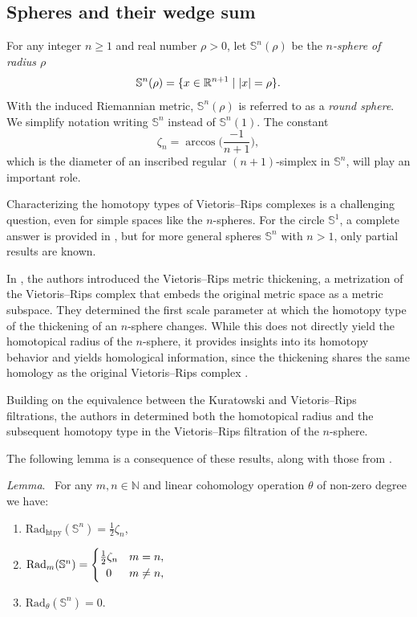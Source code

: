 \documentclass{amsart}
\makeatletter
\renewcommand\subsubsection{\@startsection{subsubsection}{3}
	\z@{.5\linespacing\@plus.7\linespacing}{0em}
	{\normalfont\itshape}}
\theoremstyle{definition}
\newcommand{\N}{\mathbb{N}}
\newcommand{\R}{\mathbb{R}}
\DeclarePairedDelimiter\bars{\lvert}{\rvert}
\DeclarePairedDelimiter\set{\{}{\}}
\newcommand{\bS}{\mathbb{S}}
\newcommand{\darkblue}{\color{darkblue}}
\newcommand{\defn}[1]{{\darkblue \emph{#1}}}
\renewcommand{\lemma}{\medskip\noindent\textit{\darkblue Lemma}.\ }
\theoremstyle{theorem}
\newcommand{\crit}{\mathrm{Rad}_{\mathrm{htpy}}}
\newcommand{\firstdeath}[2]{\mathrm{Rad}_{#1}(#2)}
\providecommand{\DIFaddtex}[1]{{\protect\color{blue}\uwave{#1}}} %
\providecommand{\DIFdeltex}[1]{{\protect\color{red}\sout{#1}}}                      %
\providecommand{\DIFadd}[1]{\texorpdfstring{\DIFaddtex{#1}}{#1}} %
\providecommand{\DIFdel}[1]{\texorpdfstring{\DIFdeltex{#1}}{}} %
\renewcommand{\DIFadd}[1]{{\color{red}#1}}
\renewcommand{\DIFdel}[1]{{\color{deletedpurple}\ifmmode\oldmath{#1}\else\sout{#1}\fi}}
\newcommand{\oldmath}[1]{{\color{deletedpurple}\mathpalette\horizontalstrike{#1}}}
\newcommand{\horizontalstrike}[2]{\sbox0{$#1#2$}\rlap{\raisebox{.5\ht0}{\rule{\wd0}{.4pt}}}\usebox0}
\makeatother
\begin{document}
\subsection{Spheres and their wedge sum}\label{ss:Sn}

For any integer $n \geq 1$ and real number $\rho > 0$, let $\bS^n(\rho)$ be the \defn{$n$-sphere of radius $\rho$}
\[
\bS^n(\rho) = \set{x \in \R^{n+1} \mid \bars{x} = \rho}.
\]
With the induced Riemannian metric, \(\bS^n(\rho)\) is referred to as a \defn{round sphere}.
We simplify notation writing \(\bS^n\) instead of \(\bS^n(1)\).
The constant
\[
\zeta_n = \arccos\Big(\frac{-1}{n+1}\Big),
\]
which is the diameter of an inscribed regular $(n+1)$-simplex in $\bS^n$, will play an important role.

\subsubsection{}\label{ss:critical values of Sn}

Characterizing the homotopy types of Vietoris--Rips complexes is a challenging question, even for simple spaces like the $n$-spheres.
For the circle $\bS^1$, a complete answer is provided in \cite{adamaszek2017VietorisProduct}, but for more general spheres $\bS^n$ with $n>1$, only partial results are known.

In \cite{adamaszek2018metric}, the authors introduced the Vietoris--Rips metric thickening, a metrization of the Vietoris--Rips complex that embeds the original metric space as a metric subspace. They determined the first scale parameter at which the homotopy type of the thickening of an \(n\)-sphere changes.
While this does not directly yield the homotopical radius of the \(n\)-sphere, it provides insights into its homotopy behavior and yields homological information, since the thickening shares the same homology as the original Vietoris–Rips complex \cite[\DIFdel{Cor.}\DIFadd{Corollary}~3]{gillespie2024vietoris}.

Building on the equivalence between the Kuratowski and Vietoris--Rips filtrations, the authors in \cite{lim2024vietoris} determined both the homotopical radius and the subsequent homotopy type in the Vietoris--Rips filtration of the \(n\)-sphere.

The following lemma is a consequence of these results, along with those from \cite{katz1983filling}.

\lemma
For any $m,n \in \N$ and linear cohomology operation $\theta$ of non-zero degree we have:
\begin{enumerate}
	\item \(\crit(\bS^n) = \frac{1}{2}\zeta_n\),
	\item \(\firstdeath{m}{\bS^n} =
	\begin{cases}
		\frac{1}{2}\zeta_n & m = n, \\
		\hfil 0 & m \neq n,
	\end{cases}\)
	\item \(\firstdeath{\theta}{\bS^n} = 0\).
\end{enumerate}
\end{document}
